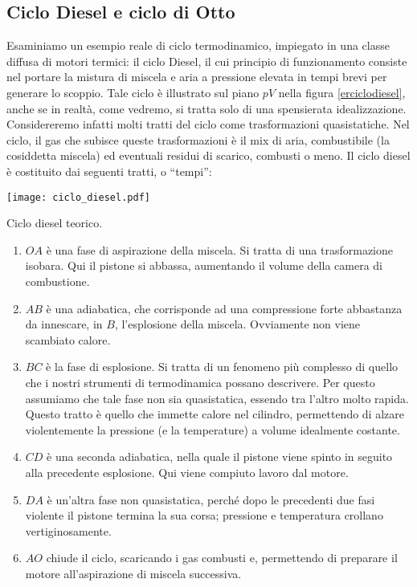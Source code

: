 \subsection{Ciclo Diesel e ciclo di Otto}
Esaminiamo un esempio reale di ciclo termodinamico, impiegato in
una classe diffusa di motori termici: il ciclo Diesel, il cui
principio di funzionamento consiste nel portare la mistura di
miscela e aria a pressione elevata in tempi brevi per generare
lo scoppio. Tale ciclo
è illustrato sul piano $pV$ nella figura \ref{erciclodiesel}, anche
se in realtà, come vedremo, si tratta solo di una spensierata idealizzazione.
Considereremo infatti molti tratti del ciclo come trasformazioni
quasistatiche. Nel ciclo, il gas che subisce queste trasformazioni
è il mix di aria, combustibile (la cosiddetta miscela) ed
eventuali residui di scarico, combusti o meno.
Il ciclo diesel è costituito dai seguenti tratti, o
``tempi'':

\begin{marginfigure}
    \centering
    \texttt{[image: ciclo\_diesel.pdf]}
    \caption{Ciclo diesel teorico.}
    \label{erciclodiesel}
\end{marginfigure}

\begin{enumerate}
    \item $OA$ è una fase di aspirazione della miscela. Si
    tratta di una trasformazione isobara. Qui il pistone si
    abbassa, aumentando il volume della camera di combustione.

    \item $AB$ è una adiabatica, che corrisponde ad una compressione
    forte abbastanza da innescare, in $B$, l'esplosione della
    miscela. Ovviamente non viene scambiato calore.

    \item $BC$ è la fase di esplosione. Si tratta di un fenomeno
    più complesso di quello che i nostri strumenti di termodinamica
    possano descrivere. Per questo assumiamo che tale fase non
    sia quasistatica, essendo tra l'altro molto rapida. Questo tratto
    è quello che immette calore
    nel cilindro, permettendo di alzare violentemente la pressione
    (e la temperature) a volume idealmente costante.

    \item $CD$ è una seconda adiabatica, nella quale il pistone
    viene spinto in seguito alla precedente esplosione. Qui viene
    compiuto lavoro dal motore.

    \item $DA$ è un'altra fase non quasistatica, perché dopo le
    precedenti due fasi violente il pistone termina la sua
    corsa; pressione e temperatura crollano vertiginosamente.

    \item $AO$ chiude il ciclo, scaricando i gas combusti e,
    permettendo di preparare il motore all'aspirazione di miscela
    successiva.
\end{enumerate}

